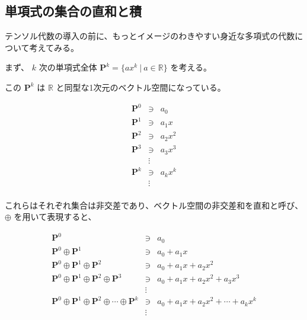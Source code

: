 \documentclass[uplatex,a4j,12pt,dvipdfmx]{jsarticle}
\begin{document}
\subsection{単項式の集合の直和と積}

テンソル代数の導入の前に、もっとイメージのわきやすい身近な多項式の代数について考えてみる。

まず、 $k$ 次の単項式全体 $\mathbf{P}^{k} = \{ ax^{k} \ | \ a \in \mathbb{R} \}$ を考える。

この $\mathbf{P}^{k}$ は $\mathbb{R}$ と同型な1次元のベクトル空間になっている。

\[
	\begin{array}{rcl}
		\mathbf{P}^{0} & \ni    & a_{0}       \\
		\mathbf{P}^{1} & \ni    & a_{1} x     \\
		\mathbf{P}^{2} & \ni    & a_{2} x^{2} \\
		\mathbf{P}^{3} & \ni    & a_{3} x^{3} \\
		               & \vdots &             \\
		\mathbf{P}^{k} & \ni    & a_{k} x^{k} \\
		               & \vdots &             \\
	\end{array}
\]

これらはそれぞれ集合は非交差であり、ベクトル空間の非交差和を直和と呼び、$\oplus$ を用いて表現すると、

\[
	\begin{array}{rcl}
		\mathbf{P}^{0}                                                                                 & \ni    & a_{0}                                                \\
		\mathbf{P}^{0} \oplus \mathbf{P}^{1}                                                           & \ni    & a_{0} + a_{1} x                                      \\
		\mathbf{P}^{0} \oplus \mathbf{P}^{1} \oplus \mathbf{P}^{2}                                     & \ni    & a_{0} + a_{1} x + a_{2} x^{2}                        \\
		\mathbf{P}^{0} \oplus \mathbf{P}^{1} \oplus \mathbf{P}^{2} \oplus \mathbf{P}^{3}               & \ni    & a_{0} + a_{1} x + a_{2} x^{2} + a_{3} x^{3}          \\
		                                                                                               & \vdots &                                                      \\
		\mathbf{P}^{0} \oplus \mathbf{P}^{1} \oplus \mathbf{P}^{2} \oplus \cdots \oplus \mathbf{P}^{k} & \ni    & a_{0} + a_{1} x + a_{2} x^{2} + \cdots + a_{k} x^{k} \\
		                                                                                               & \vdots &                                                      \\
	\end{array}
\]
\end{document}
